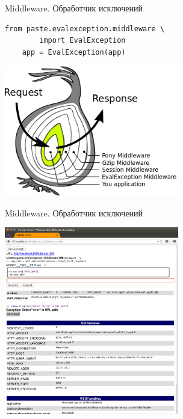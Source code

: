 \begin{frame}[fragile]{Middleware. Обработчик исключений}
    \begin{lstlisting}[style=python]
    from paste.evalexception.middleware \
        import EvalException
    app = EvalException(app)
    \end{lstlisting}
    \begin{center}
        \includegraphics[width=3in]{media/wsgi-as-onion-evalexception.png}
    \end{center}
\end{frame}

\begin{frame}{Middleware. Обработчик исключений}
    \begin{center}
        \includegraphics[width=3in]{media/wsgi_example_error.png}
    \end{center}
\end{frame}

